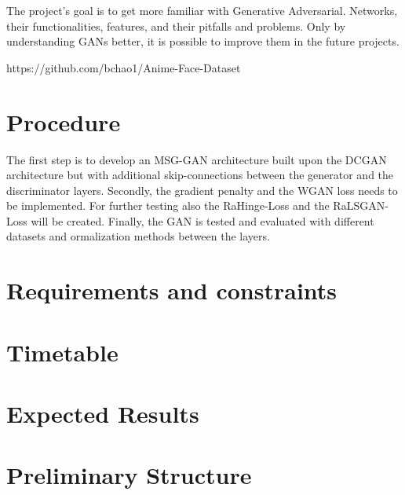 \documentclass[conference,onecolumn,compsoc]{IEEEtran}
\begin{document}
\noindent
The project's goal is to get more familiar with Generative Adversarial. Networks, their functionalities, features, and their pitfalls and problems. Only by understanding GANs better, it is possible to improve them in the future projects.

https://github.com/bchao1/Anime-Face-Dataset


\section{Procedure}

\noindent
The first step is to develop an MSG-GAN \cite{karnewar2020msggan} architecture built upon the DCGAN \cite{radford2016unsupervised} architecture but with additional skip-connections between the generator and the discriminator layers. Secondly, the gradient penalty and the WGAN loss needs to be implemented. For further testing also the RaHinge-Loss and the RaLSGAN-Loss  will be created. Finally, the GAN is tested and evaluated with different datasets and ormalization methods between the layers.

\section{Requirements and constraints}

\blindtext

\section{Timetable}

\noindent
\blindtext \cite{yazıcı2019unusual}

\section{Expected Results}

\noindent
\blindtext


\section{Preliminary  Structure}
\end{document}
